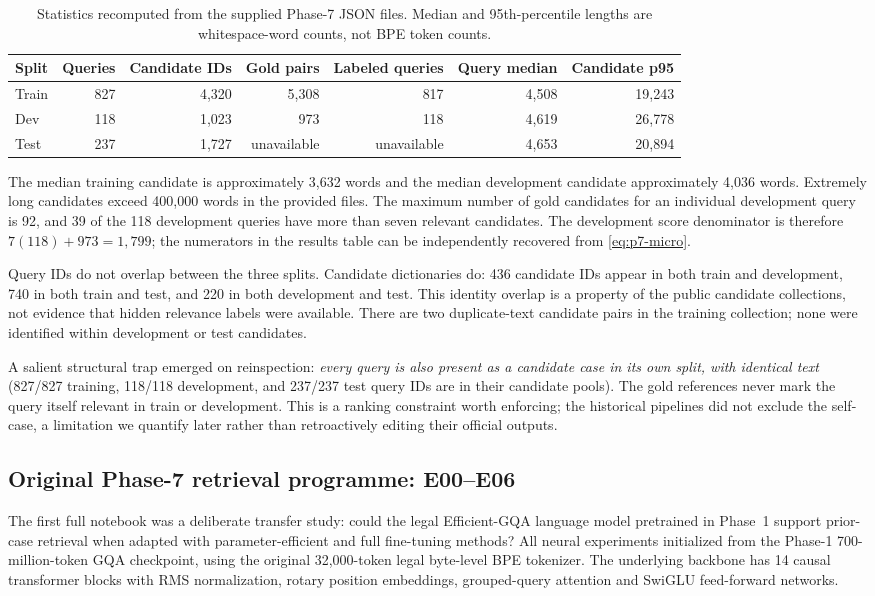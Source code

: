 \begin{table}[htbp]
\centering
\small
\caption{Statistics recomputed from the supplied Phase-7 JSON files. Median
and 95th-percentile lengths are whitespace-word counts, not BPE token counts.}
\label{tab:p7-data}
\begin{tabular}{lrrrrrr}
\toprule
Split & Queries & Candidate IDs & Gold pairs & Labeled queries & Query median & Candidate p95 \\
\midrule
Train & 827 & 4,320 & 5,308 & 817 & 4,508 & 19,243 \\
Dev   & 118 & 1,023 & 973 & 118 & 4,619 & 26,778 \\
Test  & 237 & 1,727 & unavailable & unavailable & 4,653 & 20,894 \\
\bottomrule
\end{tabular}
\end{table}

The median training candidate is approximately 3,632 words and the median
development candidate approximately 4,036 words. Extremely long candidates exceed
400,000 words in the provided files. The maximum number of gold candidates for an
individual development query is 92, and 39 of the 118 development queries have more
than seven relevant candidates. The development score denominator is therefore
$7(118)+973=1,799$; the numerators in the results table can be independently
recovered from \eqref{eq:p7-micro}.

Query IDs do not overlap between the three splits. Candidate dictionaries do:
436 candidate IDs appear in both train and development, 740 in both train and
test, and 220 in both development and test. This identity overlap is a property
of the public candidate collections, not evidence that hidden relevance labels
were available. There are two duplicate-text candidate pairs in the training
collection; none were identified within development or test candidates.

A salient structural trap emerged on reinspection: \emph{every query is also present
as a candidate case in its own split, with identical text} (827/827 training,
118/118 development, and 237/237 test query IDs are in their candidate pools).
The gold references never mark the query itself relevant in train or development.
This is a ranking constraint worth enforcing; the historical pipelines did not
exclude the self-case, a limitation we quantify later rather than retroactively
editing their official outputs.

\subsection{Original Phase-7 retrieval programme: E00--E06}
\label{subsec:p7-original}
The first full notebook was a deliberate transfer study: could the legal
Efficient-GQA language model pretrained in Phase~1 support prior-case retrieval
when adapted with parameter-efficient and full fine-tuning methods? All neural
experiments initialized from the Phase-1 700-million-token GQA checkpoint,
using the original 32,000-token legal byte-level BPE tokenizer. The underlying
backbone has 14 causal transformer blocks with RMS normalization, rotary
position embeddings, grouped-query attention and SwiGLU feed-forward networks.

